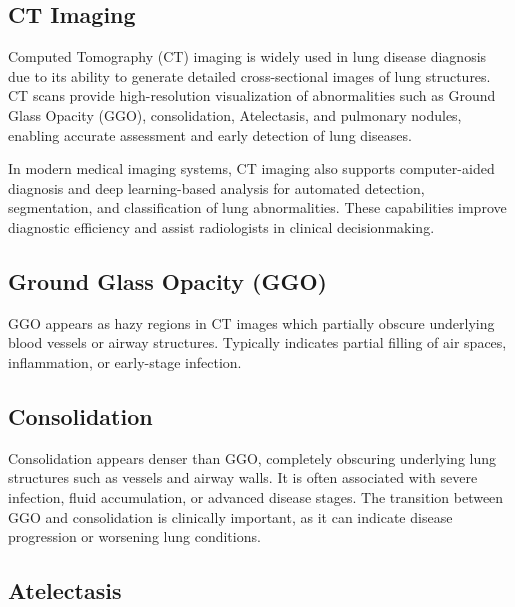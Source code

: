 \subsection{CT Imaging}

Computed Tomography (CT) imaging is widely used in lung disease diagnosis due to its ability to generate detailed cross-sectional images of lung structures. \cite{sluimer2006ct} %
CT scans provide high-resolution visualization of abnormalities such as Ground Glass Opacity (GGO), consolidation, Atelectasis, and pulmonary nodules, enabling accurate assessment and early detection of lung diseases. \cite{hansell2008fleischner} %

In modern medical imaging systems, CT imaging also supports computer-aided diagnosis and deep learning-based analysis for automated detection, segmentation, and classification of lung abnormalities. \cite{litjens2017survey} %
These capabilities improve diagnostic efficiency and assist radiologists in clinical decisionmaking.

\subsection{Ground Glass Opacity (GGO)}

GGO appears as hazy regions in CT images which partially obscure underlying blood vessels or airway structures.
Typically indicates partial filling of air spaces, inflammation, or early-stage infection. \cite{park2011ggo}
\subsection{Consolidation}

Consolidation appears denser than GGO, completely obscuring underlying lung structures such as vessels and airway walls. \cite{hansell2008fleischner}
It is often associated with severe infection, fluid accumulation, or advanced disease stages.
The transition between GGO and consolidation is clinically important, as it can indicate disease progression or worsening lung conditions. \cite{chung2021covid}

\subsection{Atelectasis}


